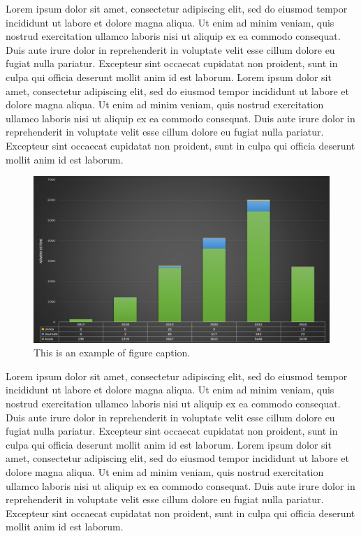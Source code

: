\documentclass[english]{sbc2025}%
\begin{document}
Lorem ipsum dolor sit amet, consectetur adipiscing elit, sed do eiusmod tempor incididunt ut labore et dolore magna aliqua. Ut enim ad minim veniam, quis nostrud exercitation ullamco laboris nisi ut aliquip ex ea commodo consequat. Duis aute irure dolor in reprehenderit in voluptate velit esse cillum dolore eu fugiat nulla pariatur. Excepteur sint occaecat cupidatat non proident, sunt in culpa qui officia deserunt mollit anim id est laborum. Lorem ipsum dolor sit amet, consectetur adipiscing elit, sed do eiusmod tempor incididunt ut labore et dolore magna aliqua. Ut enim ad minim veniam, quis nostrud exercitation ullamco laboris nisi ut aliquip ex ea commodo consequat. Duis aute irure dolor in reprehenderit in voluptate velit esse cillum dolore eu fugiat nulla pariatur. Excepteur sint occaecat cupidatat non proident, sunt in culpa qui officia deserunt mollit anim id est laborum.

\begin{figure}
\begin{center}
\includegraphics[width=30pc]{sol.jpg}
\caption{{This is an example of figure caption.}}
 \label{Fig2}
\end{center}
\end{figure}

Lorem ipsum dolor sit amet, consectetur adipiscing elit, sed do eiusmod tempor incididunt ut labore et dolore magna aliqua. Ut enim ad minim veniam, quis nostrud exercitation ullamco laboris nisi ut aliquip ex ea commodo consequat. Duis aute irure dolor in reprehenderit in voluptate velit esse cillum dolore eu fugiat nulla pariatur. Excepteur sint occaecat cupidatat non proident, sunt in culpa qui officia deserunt mollit anim id est laborum. Lorem ipsum dolor sit amet, consectetur adipiscing elit, sed do eiusmod tempor incididunt ut labore et dolore magna aliqua. Ut enim ad minim veniam, quis nostrud exercitation ullamco laboris nisi ut aliquip ex ea commodo consequat. Duis aute irure dolor in reprehenderit in voluptate velit esse cillum dolore eu fugiat nulla pariatur. Excepteur sint occaecat cupidatat non proident, sunt in culpa qui officia deserunt mollit anim id est laborum.
\end{document}
